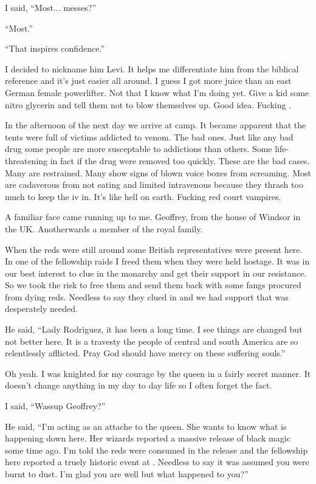 I said, ``Most... messes?''

``Most.''

``That inspires confidence.''

I decided to nickname him Levi. It helps me differentiate him from the biblical reference and it's just easier all around. I guess I got more juice than an east German female powerlifter. Not that I know what I'm doing yet. Give a kid some nitro glycerin and tell them not to blow themselves up. Good idea. Fucking \chichenitza{}.

\parasep

In the afternoon of the next day we arrive at camp. It became apparent that the tents were full of victims addicted to venom. The bad ones. Just like any bad drug some people are more susceptable to addictions than others. Some life-threatening in fact if the drug were removed too quickly. These are the bad cases. Many are restrained. Many show signs of blown voice boxes from screaming. Most are cadaverous from not eating and limited intravenous because they thrash too much to keep the iv in. It's like hell on earth. Fucking red court vampires.

A familiar face came running up to me. Geoffrey, from the house of Windsor in the UK. Anotherwards a member of the royal family.

When the reds were still around some British representatives were present here. In one of the fellowship raids I freed them when they were held hostage. It was in our best interest to clue in the monarchy and get their support in our resistance. So we took the risk to free them and send them back with some fangs procured from dying reds. Needless to say they clued in and we had support that was desperately needed.

He said, ``Lady Rodriguez, it has been a long time. I see things are changed but not better here. It is a travesty the people of central and south America are so relentlessly afflicted. Pray God should have mercy on these suffering souls.''

Oh yeah. I was knighted for my courage by the queen in a fairly secret manner. It doesn't change anything in my day to day life so I often forget the fact.

I said, ``Wassup Geoffrey?''

He said, ``I'm acting as an attache to the queen. She wants to know what is happening down here. Her wizards reported a massive release of black magic some time ago. I'm told the reds were consumed in the release and the fellowship here reported a truely historic event at \chichenitza{}. Needless to say it was assumed you were burnt to dust. I'm glad you are well but what happened to you?''

